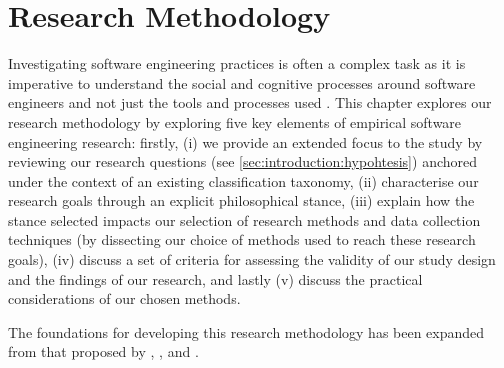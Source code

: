\chapter{Research Methodology}
\label{ch:research-methodology}

\graphicspath{{mainmatter/research-methodology/figures/}}

\label{sec:research-methodology:preface}

Investigating software engineering practices is often a complex task as it is imperative to understand the social and cognitive processes around software engineers and not just the tools and processes used \citep{Easterbrook:2007ws}. This chapter explores our research methodology by exploring five key elements of empirical software engineering research: firstly, (i) we provide an extended focus to the study by reviewing our research questions (see \cref{sec:introduction:hypohtesis}) anchored under the context of an existing classification taxonomy, (ii) characterise our research goals through an explicit philosophical stance, (iii) explain how the stance selected impacts our selection of research methods and data collection techniques (by dissecting our choice of methods used to reach these research goals), (iv) discuss a set of criteria for assessing the validity of our study design and the findings of our research, and lastly (v) discuss the practical considerations of our chosen methods. 

The foundations for developing this research methodology has been expanded from that proposed by \citet{Easterbrook:2007ws}, \citet{Wohlin:2014jq}, \citet{Wohlin:2012bu} and \citet{Shaw:2003aa}.




